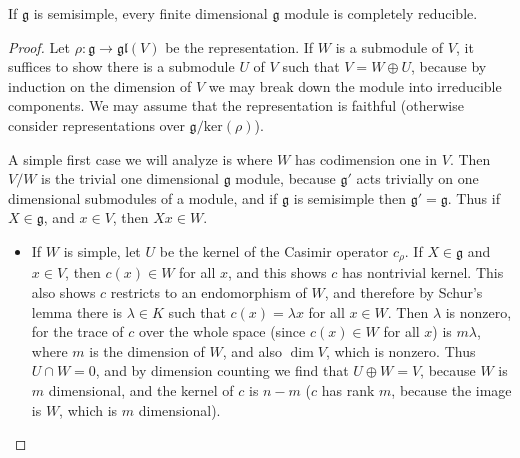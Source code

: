 \begin{theorem}[Weyl]
    If $\mathfrak{g}$ is semisimple, every finite dimensional $\mathfrak{g}$ module is completely reducible.
\end{theorem}
\begin{proof}
    Let $\rho: \mathfrak{g} \to \mathfrak{gl}(V)$ be the representation. If $W$ is a submodule of $V$, it suffices to show there is a submodule $U$ of $V$ such that $V = W \oplus U$, because by induction on the dimension of $V$ we may break down the module into irreducible components. We may assume that the representation is faithful (otherwise consider representations over $\mathfrak{g}/\text{ker}(\rho)$).

    A simple first case we will analyze is where $W$ has codimension one in $V$. Then $V/W$ is the trivial one dimensional $\mathfrak{g}$ module, because $\mathfrak{g}'$ acts trivially on one dimensional submodules of a module, and if $\mathfrak{g}$ is semisimple then $\mathfrak{g}' = \mathfrak{g}$. Thus if $X \in \mathfrak{g}$, and $x \in V$, then $Xx \in W$.
    \begin{itemize}
        \item If $W$ is simple, let $U$ be the kernel of the Casimir operator $c_\rho$. If $X \in \mathfrak{g}$ and $x \in V$, then $c(x) \in W$ for all $x$, and this shows $c$ has nontrivial kernel. This also shows $c$ restricts to an endomorphism of $W$, and therefore by Schur's lemma there is $\lambda \in K$ such that $c(x) = \lambda x$ for all $x \in W$. Then $\lambda$ is nonzero, for the trace of $c$ over the whole space (since $c(x) \in W$ for all $x$) is $m \lambda$, where $m$ is the dimension of $W$, and also $\dim V$, which is nonzero. Thus $U \cap W = 0$, and by dimension counting we find that $U \oplus W = V$, because $W$ is $m$ dimensional, and the kernel of $c$ is $n - m$ ($c$ has rank $m$, because the image is $W$, which is $m$ dimensional).


\end{itemize}
\end{proof}
